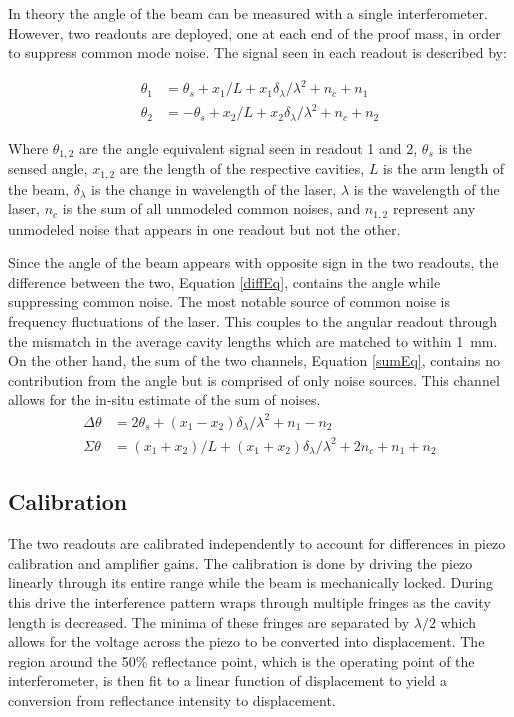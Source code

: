 \documentclass [12pt, proquest]{uwthesis}[2019]
\begin{document}
In theory the angle of the beam can be measured with a single interferometer. However, two readouts are deployed, one at each end of the proof mass, in order to suppress common mode noise. The signal seen in each readout is described by:

\begin{align}
\theta_1&=\theta_s+x_1/L+x_1 \delta_\lambda/\lambda^2+n_c+n_1 \label{th1} \\
\theta_2&=-\theta_s+x_2/L+x_2 \delta_\lambda/\lambda^2 + n_c+n_2 \label{th2}
\end{align}

Where $\theta_{1,2}$ are the angle equivalent signal seen in readout 1 and 2, $\theta_{s}$ is the sensed angle, $x_{1,2}$ are the length of the respective cavities, $L$ is the arm length of the beam, $\delta_\lambda$ is the change in wavelength of the laser, $\lambda$ is the wavelength of the laser, $n_c$ is the sum of all unmodeled common noises, and $n_{1,2}$ represent any unmodeled noise that appears in one readout but not the other.

Since the angle of the beam appears with opposite sign in the two readouts, the difference between the two, Equation \ref{diffEq}, contains the angle while suppressing common noise. The most notable source of common noise is frequency fluctuations of the laser. This couples to the angular readout through the mismatch in the average cavity lengths which are matched to within 1~mm. On the other hand, the sum of the two channels, Equation \ref{sumEq}, contains no contribution from the angle but is comprised of only noise sources. This channel allows for the in-situ estimate of the sum of noises.
\begin{align}
\Delta \theta&=2\theta_s+ (x_1-x_2)\delta_\lambda/\lambda^2+n_1-n_2 \label{diffEq} \\
\Sigma \theta&=(x_1+x_2)/L+ (x_1+x_2)\delta_\lambda/\lambda^2+2n_c+n_1+n_2 \label{sumEq}
\end{align}


\subsection{Calibration}

The two readouts are calibrated independently to account for differences in piezo calibration and amplifier gains. The calibration is done by driving the piezo linearly through its entire range while the beam is mechanically locked. During this drive the interference pattern wraps through multiple fringes as the cavity length is decreased. The minima of these fringes are separated by $\lambda/2$ which allows for the voltage across the piezo to be converted into displacement. The region around the 50\% reflectance point, which is the operating point of the interferometer, is then fit to a linear function of displacement to yield a conversion from reflectance intensity to displacement.  
\end{document}
